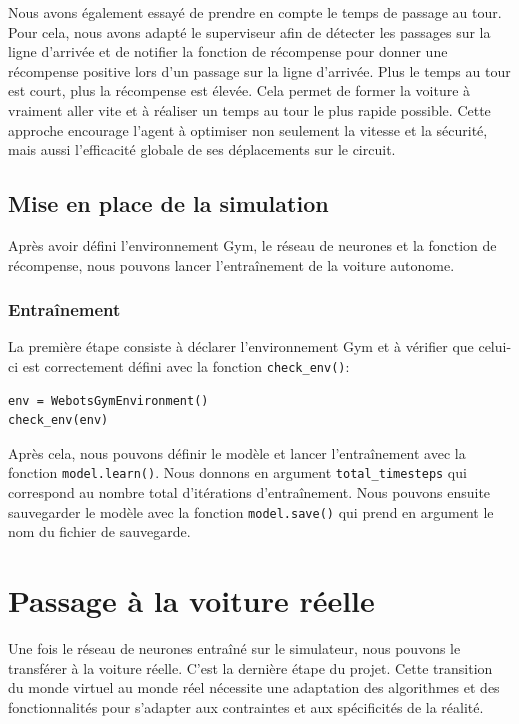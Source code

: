 \documentclass[french]{article}
\begin{document}
\vspace{0.5cm}
Nous avons également essayé de prendre en compte le temps de passage au tour. Pour cela, nous avons adapté le 
superviseur afin de détecter les passages sur la ligne d'arrivée et de notifier la fonction de récompense pour 
donner une récompense positive lors d'un passage sur la ligne d'arrivée. Plus le temps au tour est court, plus 
la récompense est élevée. Cela permet de former la voiture à vraiment aller vite et à réaliser un temps au tour 
le plus rapide possible. Cette approche encourage l'agent à optimiser non seulement la vitesse et la sécurité, 
mais aussi l'efficacité globale de ses déplacements sur le circuit.


\subsection{Mise en place de la simulation}
Après avoir défini l'environnement Gym, le réseau de neurones et la fonction de récompense, nous pouvons lancer
l'entraînement de la voiture autonome.

\subsubsection*{Entraînement}
La première étape consiste à déclarer l'environnement Gym et à vérifier que celui-ci est correctement défini avec 
la fonction \texttt{check\_env()}:

\begin{verbatim}
env = WebotsGymEnvironment()
check_env(env)
\end{verbatim}

Après cela, nous pouvons définir le modèle et lancer l'entraînement avec la fonction \texttt{model.learn()}. Nous 
donnons en argument \texttt{total\_timesteps} qui correspond au nombre total d'itérations d'entraînement. Nous 
pouvons ensuite sauvegarder le modèle avec la fonction \texttt{model.save()} qui prend en argument le nom du fichier
de sauvegarde.

\section*{Passage à la voiture réelle}
Une fois le réseau de neurones entraîné sur le simulateur, nous pouvons le transférer à la voiture réelle. C'est 
la dernière étape du projet. Cette transition du monde virtuel au monde réel nécessite une adaptation des algorithmes 
et des fonctionnalités pour s'adapter aux contraintes et aux spécificités de la réalité.
\end{document}
